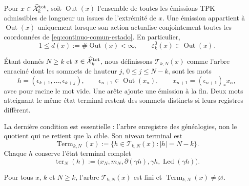 Pour \(x\in\widehat{\mathcal X}^{\rm tot}_k\), soit \(\operatorname{Out}(x)\) l'ensemble de toutes les émissions TPK admissibles de longueur un issues de l'extrémité de \(x\). Une émission appartient à \(\operatorname{Out}(x)\) uniquement lorsque son action actualise conjointement toutes les coordonnées de \eqref{eq:continuo-comun-estado}. En particulier,
\begin{equation}
\label{eq:continuo-comun-out-finito}
 1\leq d(x):=\#\operatorname{Out}(x)<\infty,
 \qquad
 \varepsilon^0_k(x)\in\operatorname{Out}(x).
\end{equation}

\begin{definition}
\label{def:continuo-comun-arbol-finito}
Étant donnés \(N\geq k\) et \(x\in\widehat{\mathcal X}^{\rm tot}_k\), nous définissons \(\mathscr T_{k,N}(x)\) comme l'arbre enraciné dont les sommets de hauteur \(j\), \(0\leq j\leq N-k\), sont les mots
\begin{equation}
\label{eq:continuo-comun-vertice-arbol}
 h=(\epsilon_{k+1},\ldots,\epsilon_{k+j}),
 \qquad
 \epsilon_{n+1}\in\operatorname{Out}(x_n),
 \qquad
 x_{n+1}=(\epsilon_{n+1})_*x_n,
\end{equation}
avec pour racine le mot vide. Une arête ajoute une émission à la fin. Deux mots atteignant le même état terminal restent des sommets distincts si leurs registres diffèrent.
\end{definition}

La dernière condition est essentielle : l'arbre enregistre des généalogies, non le quotient qui ne retient que la cible. Son niveau terminal est
\begin{equation}
\label{eq:continuo-comun-terminal-finito}
 \operatorname{Term}_{k,N}(x)
 :=\{h\in\mathscr T_{k,N}(x):|h|=N-k\}.
\end{equation}
Chaque \(h\) conserve l'état terminal complet
\begin{equation}
\label{eq:continuo-comun-registro-terminal}
 \operatorname{ter}_{N}(h)
 :=\bigl(x_N,m_N,\partial(\gamma h),
          \gamma h,\operatorname{Led}(\gamma h)\bigr).
\end{equation}

\begin{proposition}
\label{prop:continuo-comun-arbol-finito-no-vacio}
Pour tous \(x\), \(k\) et \(N\geq k\), l'arbre \(\mathscr T_{k,N}(x)\) est fini et \(\operatorname{Term}_{k,N}(x)\neq\varnothing\).
\end{proposition}

